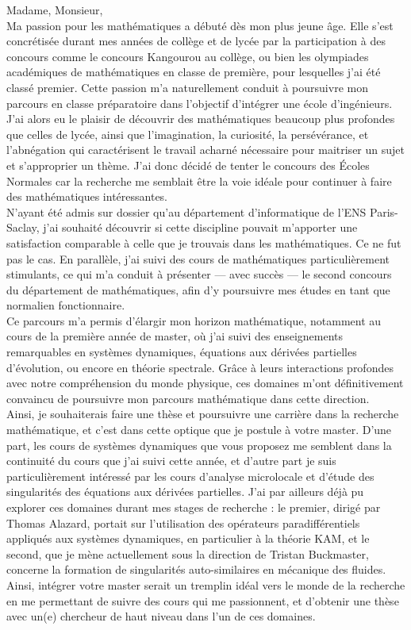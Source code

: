 \documentclass[12pt,a4paper]{article}
\begin{document}
Madame, Monsieur, \\

Ma passion pour les mathématiques a débuté dès mon plus jeune âge. Elle s’est concrétisée durant mes années de collège et de lycée par la participation à des concours comme le concours Kangourou au collège, ou bien les olympiades académiques de mathématiques en classe de première, pour lesquelles j’ai été classé premier.  Cette passion m’a naturellement conduit à poursuivre mon parcours en classe préparatoire dans l’objectif d’intégrer une école d’ingénieurs.  \\

J'ai alors eu le plaisir de découvrir des mathématiques beaucoup plus profondes que celles de lycée, ainsi que l’imagination, la curiosité, la persévérance, et l’abnégation qui caractérisent le travail acharné nécessaire pour maitriser un sujet et s'approprier un thème. J'ai donc décidé de tenter le concours des Écoles Normales car la recherche me semblait être la voie idéale pour continuer à faire des mathématiques intéressantes. \\

N’ayant été admis sur dossier qu’au département d’informatique de l’ENS Paris-Saclay, j’ai souhaité découvrir si cette discipline pouvait m’apporter une satisfaction comparable à celle que je trouvais dans les mathématiques. Ce ne fut pas le cas. En parallèle, j’ai suivi des cours de mathématiques particulièrement stimulants, ce qui m’a conduit à présenter — avec succès — le second concours du département de mathématiques, afin d’y poursuivre mes études en tant que normalien fonctionnaire.\\

Ce parcours m’a permis d’élargir mon horizon mathématique, notamment au cours de la première année de master, où j’ai suivi des enseignements remarquables en systèmes dynamiques, équations aux dérivées partielles d’évolution, ou encore en théorie spectrale. Grâce à leurs interactions profondes avec notre compréhension du monde physique, ces domaines m’ont définitivement convaincu de poursuivre mon parcours mathématique dans cette direction.\\

Ainsi, je souhaiterais faire une thèse et poursuivre une carrière dans la recherche mathématique, et c'est dans cette optique que je postule à votre master. D'une part, les cours de systèmes dynamiques que vous proposez me semblent dans la continuité du cours que j'ai suivi cette année, et d'autre part je suis particulièrement intéressé par les cours d'analyse microlocale et d'étude des singularités des équations aux dérivées partielles. J'ai par ailleurs déjà pu explorer ces domaines durant mes stages de recherche : le premier, dirigé par Thomas Alazard, portait sur l'utilisation des opérateurs paradifférentiels appliqués aux systèmes dynamiques, en particulier à la théorie KAM, et le second, que je mène actuellement sous la direction de Tristan Buckmaster, concerne la formation de singularités auto-similaires en mécanique des fluides. \\

Ainsi, intégrer votre master serait un tremplin idéal vers le monde de la recherche en me permettant de suivre des cours qui me passionnent, et d'obtenir une thèse avec un(e) chercheur de haut niveau dans l'un de ces domaines.
\end{document}

